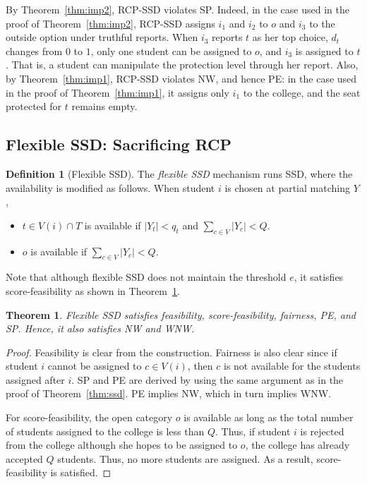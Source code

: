 \documentclass[a4paper,twoside]{article}
\newtheorem{theorem}{Theorem}
\theoremstyle{definition}
\newtheorem{definition}{Definition}
\begin{document}
By Theorem~\ref{thm:imp2}, RCP-SSD violates SP.
Indeed, in the case used in the proof of Theorem~\ref{thm:imp2}, RCP-SSD assigns
$i_1$ and $i_2$ to $o$ and $i_3$ to the outside option under truthful reports.
When $i_3$ reports $t$ as her top choice, $d_t$ changes from $0$ to $1$, only one student
can be assigned to $o$, and $i_3$ is assigned to $t$.
That is, a student can manipulate the protection level through her report.
Also, by Theorem~\ref{thm:imp1}, RCP-SSD violates 
NW, and hence PE: in the case used in the proof of Theorem~\ref{thm:imp1}, it assigns only $i_1$
to the college, and the seat protected for $t$ remains empty.




\subsection{Flexible SSD: Sacrificing RCP}

\begin{definition}[Flexible SSD]
\label{def:flexssd}
The \emph{flexible SSD} mechanism runs SSD, where the availability is
modified as follows.
When student $i$ is chosen at partial matching $Y$, 
\begin{itemize}
    \item $t\in V(i)\cap T$ is available if $|Y_t|< q_t$ and 
    $\sum_{c \in V} |Y_c| < Q$.
\item $o$ is available if $\sum_{c \in V} |Y_c| < Q$.
\end{itemize}
\end{definition}
Note that although 
flexible SSD does not maintain the threshold $e$, 
it satisfies score-feasibility as shown in Theorem~\ref{thm:flexible}.



\begin{theorem}
\label{thm:flexible}
Flexible SSD satisfies feasibility, score-feasibility, fairness, PE, and
SP. Hence, it also satisfies NW and WNW.
\end{theorem}
\begin{proof}
Feasibility is clear from the construction. 
Fairness is also clear since if student $i$ cannot be 
assigned to $c \in V(i)$, then $c$ is not available for
the students assigned after $i$. 
SP and PE are derived by using the same argument as in the proof of Theorem~\ref{thm:ssd}.
PE implies NW, which in turn implies
WNW.

For score-feasibility, 
the open category $o$ is available as long as the total number 
of students assigned to the college is less than $Q$. 
Thus, if student $i$ is rejected from the college although she hopes to be assigned to $o$, the college has already accepted $Q$ students. 
Thus, no more students are assigned. 
As a result, score-feasibility is satisfied. 
\end{proof}
\end{document}
